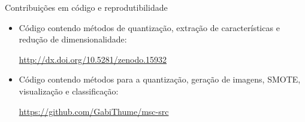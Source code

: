 \documentclass[10pt]{beamer}
\begin{document}
\begin{frame}{Contribuições em código e reprodutibilidade}
  \setlength\leftmargini{1em}
    \begin{itemize}
    \item Código contendo métodos de quantização, extração de características e redução de dimensionalidade:
    \begin{center}
      \small{\url{http://dx.doi.org/10.5281/zenodo.15932}}
    \end{center}
    \item Código contendo métodos para a quantização, geração de imagens, SMOTE, visualização e classificação:
    \begin{center}
      \small{\url{https://github.com/GabiThume/msc-src}}
    \end{center}
  \end{itemize}
\end{frame}
\end{document}
